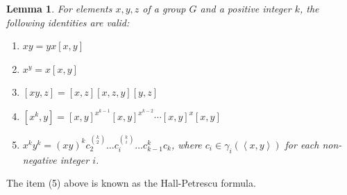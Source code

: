 \documentclass[12pt,leqno]{amsart}
\newtheorem{lem}[theorem]{\sc Lemma}
\theoremstyle{definition}
\begin{document}
\begin{lem}\label{prop_comm}
For elements $x, y, z$ of a group $G$ and a positive integer $k$, the following identities are valid:
\begin{enumerate}
\item $xy=yx[x,y]$
\item $x^y=x[x,y]$
    \item $[xy,z]=[x,z][x,z,y][y,z]$
    \item $[x^k,y]=[x,y]^{x^{k-1}}[x,y]^{x^{k-2}}\cdots [x,y]^x[x,y]$
   \item $x^ky^k=(xy)^kc_2^{\binom{k}{2}}\ldots c_i^{\binom{k}{i}}\ldots c_{k-1}^kc_k$, where $c_i\in \gamma_i(\left<x,y\right>)$ for each non-negative integer $i$.
\end{enumerate}
\end{lem}
The item (5) above is known as the Hall-Petrescu formula.
\end{document}
